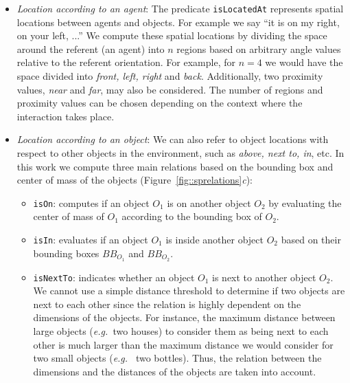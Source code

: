 \documentclass{svmult}
\newcommand{\concept}[1]{{\footnotesize \texttt{#1}}}
\newcommand{\eg}{{\textit{e.g.~}}}
\begin{document}
\begin{itemize} 

\item \emph{Location according to an agent}: The predicate
\concept{isLocatedAt} represents spatial locations between agents and objects.
For example we say ``it is on my right, on your left, ...'' We compute these
spatial locations by dividing the space around the referent (an agent) into $n$
regions based on arbitrary angle values relative to the referent orientation.
For example, for $n = 4$ we would have the space divided into \emph{front,
left, right} and \emph{back}. Additionally, two proximity values, \emph{near}
and \emph{far}, may also be considered. The number of regions and proximity
values can be chosen depending on the context where the interaction takes
place.

\item \emph{Location according to an object}: We can also refer to object
locations with respect to other objects in the environment, such as \emph{above,
next to, in}, etc. In this work we compute three main relations based on the
bounding box and center of mass of the objects 
(Figure~\ref{fig::sprelations}\emph{c}): 

\begin{itemize}
	\item \concept{isOn}: computes if an object $O_1$ is on another object $O_2$ by
	evaluating the center of mass of $O_1$ according to the bounding box of $O_2$.

	\item \concept{isIn}: evaluates if an object $O_1$ is inside another object
	$O_2$ based on their bounding boxes $BB_{O_1}$ and $BB_{O_2}$.

	\item \concept{isNextTo}: indicates whether an object $O_1$ is next to another
	object $O_2$. We cannot use a simple distance threshold to determine if two
	objects are next to each other since the relation is highly dependent on the
	dimensions of the objects. For instance, the maximum distance between large
	objects (\eg two houses) to consider them as being next to each other is much
	larger than the maximum distance we would consider for two small objects (\eg
	two bottles). Thus, the relation between the dimensions and the distances of
	the objects are taken into account.  


\end{itemize}
\end{itemize}
\end{document}
